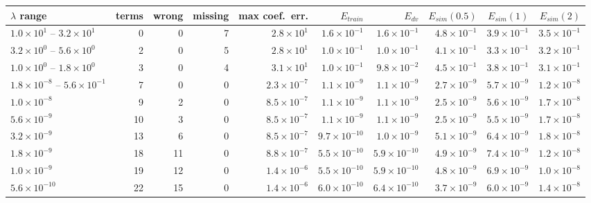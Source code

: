 \begin{tabular}{lrrrrrrrrr}\toprule
$\lambda$ range & terms & wrong & missing & max coef.\ err. & $E_{train}$ & $E_{dv}$ & $E_{sim}(0.5)$ & $E_{sim}(1)$ & $E_{sim}(2)$\\\midrule
$1.0\!\times\!10^{1}$ -- $3.2\!\times\!10^{1}$ & 0 & 0 & 7 & $2.8\!\times\!10^{1}$ & $1.6\!\times\!10^{-1}$ & $1.6\!\times\!10^{-1}$ & $4.8\!\times\!10^{-1}$ & $3.9\!\times\!10^{-1}$ & $3.5\!\times\!10^{-1}$\\
$3.2\!\times\!10^{0}$ -- $5.6\!\times\!10^{0}$ & 2 & 0 & 5 & $2.8\!\times\!10^{1}$ & $1.0\!\times\!10^{-1}$ & $1.0\!\times\!10^{-1}$ & $4.1\!\times\!10^{-1}$ & $3.3\!\times\!10^{-1}$ & $3.2\!\times\!10^{-1}$\\
$1.0\!\times\!10^{0}$ -- $1.8\!\times\!10^{0}$ & 3 & 0 & 4 & $3.1\!\times\!10^{1}$ & $1.0\!\times\!10^{-1}$ & $9.8\!\times\!10^{-2}$ & $4.5\!\times\!10^{-1}$ & $3.8\!\times\!10^{-1}$ & $3.1\!\times\!10^{-1}$\\
\rowcolor{sel}$1.8\!\times\!10^{-8}$ -- $5.6\!\times\!10^{-1}$ & 7 & 0 & 0 & $2.3\!\times\!10^{-7}$ & $1.1\!\times\!10^{-9}$ & $1.1\!\times\!10^{-9}$ & $2.7\!\times\!10^{-9}$ & $5.7\!\times\!10^{-9}$ & $1.2\!\times\!10^{-8}$\\
$1.0\!\times\!10^{-8}$ & 9 & 2 & 0 & $8.5\!\times\!10^{-7}$ & $1.1\!\times\!10^{-9}$ & $1.1\!\times\!10^{-9}$ & $2.5\!\times\!10^{-9}$ & $5.6\!\times\!10^{-9}$ & $1.7\!\times\!10^{-8}$\\
$5.6\!\times\!10^{-9}$ & 10 & 3 & 0 & $8.5\!\times\!10^{-7}$ & $1.1\!\times\!10^{-9}$ & $1.1\!\times\!10^{-9}$ & $2.5\!\times\!10^{-9}$ & $5.5\!\times\!10^{-9}$ & $1.7\!\times\!10^{-8}$\\
$3.2\!\times\!10^{-9}$ & 13 & 6 & 0 & $8.5\!\times\!10^{-7}$ & $9.7\!\times\!10^{-10}$ & $1.0\!\times\!10^{-9}$ & $5.1\!\times\!10^{-9}$ & $6.4\!\times\!10^{-9}$ & $1.8\!\times\!10^{-8}$\\
$1.8\!\times\!10^{-9}$ & 18 & 11 & 0 & $8.8\!\times\!10^{-7}$ & $5.5\!\times\!10^{-10}$ & $5.9\!\times\!10^{-10}$ & $4.9\!\times\!10^{-9}$ & $7.4\!\times\!10^{-9}$ & $1.2\!\times\!10^{-8}$\\
$1.0\!\times\!10^{-9}$ & 19 & 12 & 0 & $1.4\!\times\!10^{-6}$ & $5.5\!\times\!10^{-10}$ & $5.9\!\times\!10^{-10}$ & $4.8\!\times\!10^{-9}$ & $6.9\!\times\!10^{-9}$ & $1.0\!\times\!10^{-8}$\\
$5.6\!\times\!10^{-10}$ & 22 & 15 & 0 & $1.4\!\times\!10^{-6}$ & $6.0\!\times\!10^{-10}$ & $6.4\!\times\!10^{-10}$ & $3.7\!\times\!10^{-9}$ & $6.0\!\times\!10^{-9}$ & $1.4\!\times\!10^{-8}$\\

\end{tabular}
